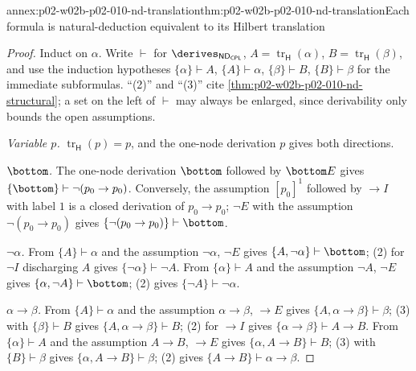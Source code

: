 \begin{annexitem}{annex:p02-w02b-p02-010-nd-translation}{thm:p02-w02b-p02-010-nd-translation}{Each formula is natural-deduction equivalent to its Hilbert translation}
\begin{proof}
Induct on \(\alpha\).  Write \(\vdash\) for
\(\derives_{\mathsf{ND}_{\mathsf{CPL}}}\), \(A=\operatorname{tr}_{\mathsf H}(\alpha)\),
\(B=\operatorname{tr}_{\mathsf H}(\beta)\), and use the induction hypotheses
\(\{\alpha\}\vdash A\), \(\{A\}\vdash\alpha\), \(\{\beta\}\vdash B\),
\(\{B\}\vdash\beta\) for the immediate subformulas.  ``(2)'' and ``(3)''
cite \cref{thm:p02-w02b-p02-010-nd-structural}; a set on the left of
\(\vdash\) may always be enlarged, since derivability only bounds the open
assumptions.

\emph{Variable \(p\).}  \(\operatorname{tr}_{\mathsf H}(p)=p\), and the
one-node derivation \(p\) gives both directions.

\emph{\(\bottom\).}  The one-node derivation \(\bottom\) followed by
\(\bottom E\) gives \(\{\bottom\}\vdash\neg(p_0\to p_0)\).  Conversely, the
assumption \([p_0]^1\) followed by \(\to I\) with label \(1\) is a closed
derivation of \(p_0\to p_0\); \(\neg E\) with the assumption
\(\neg(p_0\to p_0)\) gives \(\{\neg(p_0\to p_0)\}\vdash\bottom\).

\emph{\(\neg\alpha\).}  From \(\{A\}\vdash\alpha\) and the assumption
\(\neg\alpha\), \(\neg E\) gives \(\{A,\neg\alpha\}\vdash\bottom\); (2) for
\(\neg I\) discharging \(A\) gives \(\{\neg\alpha\}\vdash\neg A\).  From
\(\{\alpha\}\vdash A\) and the assumption \(\neg A\), \(\neg E\) gives
\(\{\alpha,\neg A\}\vdash\bottom\); (2) gives \(\{\neg A\}\vdash\neg\alpha\).

\emph{\(\alpha\to\beta\).}  From \(\{A\}\vdash\alpha\) and the assumption
\(\alpha\to\beta\), \(\to E\) gives \(\{A,\alpha\to\beta\}\vdash\beta\);
(3) with \(\{\beta\}\vdash B\) gives \(\{A,\alpha\to\beta\}\vdash B\); (2)
for \(\to I\) gives \(\{\alpha\to\beta\}\vdash A\to B\).  From
\(\{\alpha\}\vdash A\) and the assumption \(A\to B\), \(\to E\) gives
\(\{\alpha,A\to B\}\vdash B\); (3) with \(\{B\}\vdash\beta\) gives
\(\{\alpha,A\to B\}\vdash\beta\); (2) gives
\(\{A\to B\}\vdash\alpha\to\beta\).


\end{proof}
\end{annexitem}
